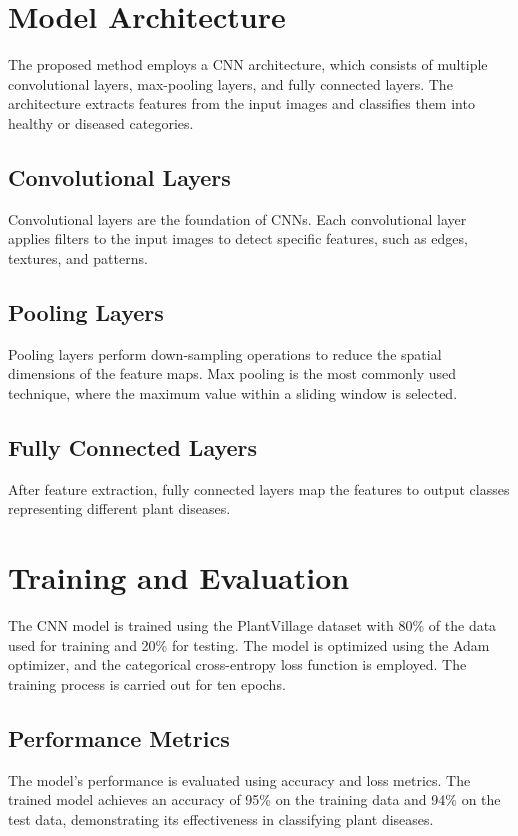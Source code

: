 \section{Model Architecture}
The proposed method employs a CNN architecture, which consists of multiple
convolutional layers, max-pooling layers, and fully connected layers. The
architecture extracts features from the input images and classifies them into
healthy or diseased categories.

\subsection{Convolutional Layers}
Convolutional layers are the foundation of CNNs. Each convolutional layer
applies filters to the input images to detect specific features, such as edges,
textures, and patterns. \cite{oshea2015introductionconvolutionalneuralnetworks}

\subsection{Pooling Layers}
Pooling layers perform down-sampling operations to reduce the spatial
dimensions of the feature maps. Max pooling is the most commonly used
technique, where the maximum value within a sliding window is selected.

\subsection{Fully Connected Layers}
After feature extraction, fully connected layers map the features to output
classes representing different plant diseases.

\section{Training and Evaluation}
The CNN model is trained using the PlantVillage dataset with 80\% of the data
used for training and 20\% for testing. The model is optimized using the Adam
optimizer, and the categorical cross-entropy loss function is employed. The
training process is carried out for ten epochs.

\subsection{Performance Metrics}
The model's performance is evaluated using accuracy and loss metrics. The
trained model achieves an accuracy of 95\% on the training data and 94\% on the
test data, demonstrating its effectiveness in classifying plant diseases.


